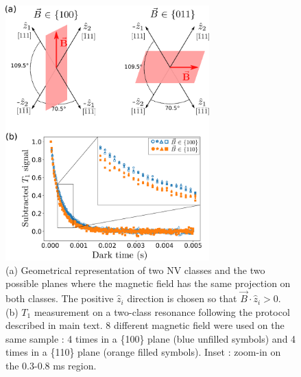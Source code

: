 \documentclass[preprintnumbers,amsmath,amssymb,onecolumn,12pt]{revtex4-2}
\begin{document}
\begin{figure}
\includegraphics[width=0.7\textwidth]{Figures_SI/121 VS 22}
\caption{(a) Geometrical representation of two NV classes and the two possible planes where the magnetic field has the same projection on both classes. The positive $\hat z_i$ direction is chosen so that $\vec{B}\cdot \hat{z}_i >0$. (b) $T_1$ measurement on a two-class resonance following the protocol described in main text. 8 different magnetic field were used on the same sample : 4 times in a \{100\} plane (blue unfilled symbols) and 4 times in a \{110\} plane (orange filled symbols). Inset : zoom-in on the 0.3-0.8 ms region.}
\label{121 VS 22 fig}
\end{figure}
\end{document}
